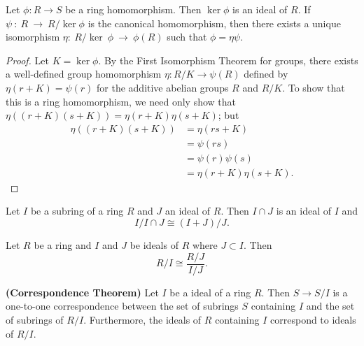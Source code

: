  
\begin{theorem}
Let $\phi : R \rightarrow S$ be a ring homomorphism. Then $\ker \phi$
is an ideal of $R$. If $\psi~:~R~\rightarrow~R/\ker \phi$ is the
canonical homomorphism, then there exists a unique isomorphism
$\eta:~R/\ker~\phi~\rightarrow~\phi(R)$ such that $\phi = \eta \psi$. 
\end{theorem}
 
 
\begin{proof}
Let $K = \ker \phi$. By the First Isomorphism Theorem for groups, there
exists a well-defined group homomorphism $\eta: R/K \rightarrow
\psi(R)$ defined by $\eta(r + K) = \psi(r)$ for the additive abelian
groups $R$ and $R/K$.  To show that this is a ring homomorphism, we
need only show that $\eta( (r + K)(s + K) ) = \eta(r + K) \eta( s +
K)$; but
\begin{align*}
\eta( (r + K)( s +K )) & = \eta(r s +K ) \\
& = \psi(r s) \\
& = \psi(r) \psi(s) \\
& = \eta( r + K ) \eta( s + K ).
\end{align*}
\end{proof}
 
 
\begin{theorem}
Let $I$ be a  subring of a ring $R$  and  $J$ an ideal of $R$.  Then
$I \cap J$ is an ideal of $I$ and 
\[
I / I \cap J \cong (I+ J) /J.
\]
\end{theorem}
 
 
\begin{theorem}
Let $R$ be a ring and $I$ and $J$ be ideals of $R$ where $J \subset
I$.  Then 
\[
R/I \cong \frac{R/J}{I/J}.
\]
\end{theorem}
 
 
\begin{theorem} {\bf (Correspondence Theorem)}\label{rings:correspond_theorem}
Let $I$ be a ideal of a ring $R$. Then $S \rightarrow S/I$ is a
one-to-one correspondence between the set of subrings $S$ containing
$I$  and the set of subrings of $R/I$. Furthermore, the ideals
of $R$ containing $I$ correspond to ideals of $R/I$. 
\end{theorem}
 
 
 
 
 
